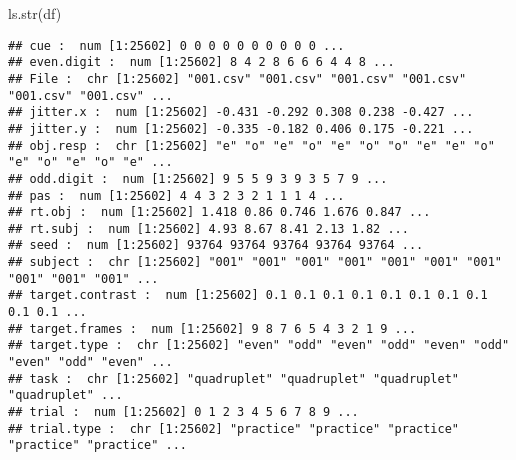 \documentclass[
]{article}
\newenvironment{Shaded}{\begin{snugshade}}{\end{snugshade}}
\newcommand{\FunctionTok}[1]{\textcolor[rgb]{0.00,0.00,0.00}{#1}}
\newcommand{\NormalTok}[1]{#1}
\begin{document}
\begin{Shaded}
\begin{Highlighting}[]
\FunctionTok{ls.str}\NormalTok{(df)}
\end{Highlighting}
\end{Shaded}

\begin{verbatim}
## cue :  num [1:25602] 0 0 0 0 0 0 0 0 0 0 ...
## even.digit :  num [1:25602] 8 4 2 8 6 6 6 4 4 8 ...
## File :  chr [1:25602] "001.csv" "001.csv" "001.csv" "001.csv" "001.csv" "001.csv" ...
## jitter.x :  num [1:25602] -0.431 -0.292 0.308 0.238 -0.427 ...
## jitter.y :  num [1:25602] -0.335 -0.182 0.406 0.175 -0.221 ...
## obj.resp :  chr [1:25602] "e" "o" "e" "o" "e" "o" "o" "e" "e" "o" "e" "o" "e" "o" "e" ...
## odd.digit :  num [1:25602] 9 5 5 9 3 9 3 5 7 9 ...
## pas :  num [1:25602] 4 4 3 2 3 2 1 1 1 4 ...
## rt.obj :  num [1:25602] 1.418 0.86 0.746 1.676 0.847 ...
## rt.subj :  num [1:25602] 4.93 8.67 8.41 2.13 1.82 ...
## seed :  num [1:25602] 93764 93764 93764 93764 93764 ...
## subject :  chr [1:25602] "001" "001" "001" "001" "001" "001" "001" "001" "001" "001" ...
## target.contrast :  num [1:25602] 0.1 0.1 0.1 0.1 0.1 0.1 0.1 0.1 0.1 0.1 ...
## target.frames :  num [1:25602] 9 8 7 6 5 4 3 2 1 9 ...
## target.type :  chr [1:25602] "even" "odd" "even" "odd" "even" "odd" "even" "odd" "even" ...
## task :  chr [1:25602] "quadruplet" "quadruplet" "quadruplet" "quadruplet" ...
## trial :  num [1:25602] 0 1 2 3 4 5 6 7 8 9 ...
## trial.type :  chr [1:25602] "practice" "practice" "practice" "practice" "practice" ...
\end{verbatim}
\end{document}

